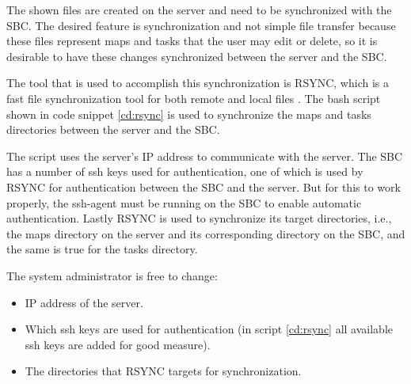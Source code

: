 The shown files are created on the server and need to be synchronized with the SBC. The desired feature is synchronization and not simple file transfer because these files represent maps and tasks that the user may edit or delete, so it is desirable to have these changes synchronized between the server and the SBC.

The tool that is used to accomplish this synchronization is RSYNC, which is a fast file synchronization tool for both remote and local files \cite{rsync-github}. The bash script shown in code snippet \ref{cd:rsync} is used to synchronize the maps and tasks directories between the server and the SBC.

The script uses the server's IP address to communicate with the server. The SBC has a number of ssh keys used for authentication, one of which is used by RSYNC for authentication between the SBC and the server. But for this to work properly, the ssh-agent must be running on the SBC to enable automatic authentication. Lastly RSYNC is used to synchronize its target directories, i.e., the maps directory on the server and its corresponding directory on the SBC, and the same is true for the tasks directory.

The system administrator is free to change:
\begin{itemize}
	\item IP address of the server.
	\item Which ssh keys are used for authentication (in script \ref{cd:rsync} all available ssh keys are added for good measure).
	\item The directories that RSYNC targets for synchronization.
\end{itemize}




